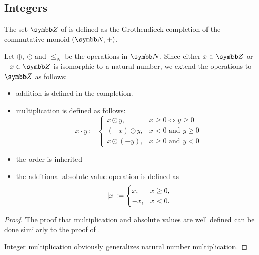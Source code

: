 \subsection{Integers}\label{subsec:integers}

\begin{definition}\label{def:integers}
  The set \( \BZ \) of  is defined as the Grothendieck completion of the commutative monoid \( (\BN, +) \).

  Let \( \oplus \), \( \odot \) and \( \leq_N \) be the operations in \( \BN \). Since either \( x \in \BZ \) or \( -x \in \BZ \) is isomorphic to a natural number, we extend the operations to \( \BZ \) as follows:
  \begin{itemize}
    \item addition is defined in the completion.
    \item multiplication is defined as follows:
    \begin{equation*}
      x \cdot y \coloneqq \begin{cases}
        x \odot y, & x \geq 0 \iff y \geq 0 \\
        (-x) \odot y, & x < 0 \text{ and } y \geq 0 \\
        x \odot (-y), & x \geq 0 \text{ and } y < 0
      \end{cases}
    \end{equation*}

    \item the order is inherited
    \item the additional absolute value operation is defined as
    \begin{equation*}
      \left\vert x \right\vert \coloneqq \begin{cases}
        x, &x \geq 0, \\
        -x, &x < 0.
      \end{cases}
    \end{equation*}
  \end{itemize}
\end{definition}
\begin{proof}
  The proof that multiplication and absolute values are well defined can be done similarly to the proof of .

  Integer multiplication obviously generalizes natural number multiplication.
\end{proof}

